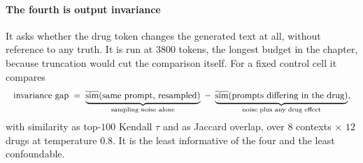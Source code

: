 \paragraph{The fourth is output invariance} It asks whether the drug token
changes the generated text at all, without reference to any truth. It is run at
$3800$ tokens, the longest budget in the chapter, because
truncation would cut the comparison
itself. For
a fixed control cell it compares
\begin{equation}
\resizebox{\linewidth}{!}{$\displaystyle
 \textrm{invariance gap} \;=\;
 \underbrace{\overline{\textrm{sim}}(\textrm{same prompt, resampled})}%
   _{\textrm{sampling noise alone}}
 \;-\; \underbrace{\overline{\textrm{sim}}(\textrm{prompts differing in the
   drug})}_{\textrm{noise plus any drug effect}},
$}
\end{equation}
with similarity as top-$100$ Kendall $\tau$ and as Jaccard overlap, over $8$
contexts $\times$ $12$ drugs at temperature $0.8$. It is the least informative
of the four and the least confoundable.

